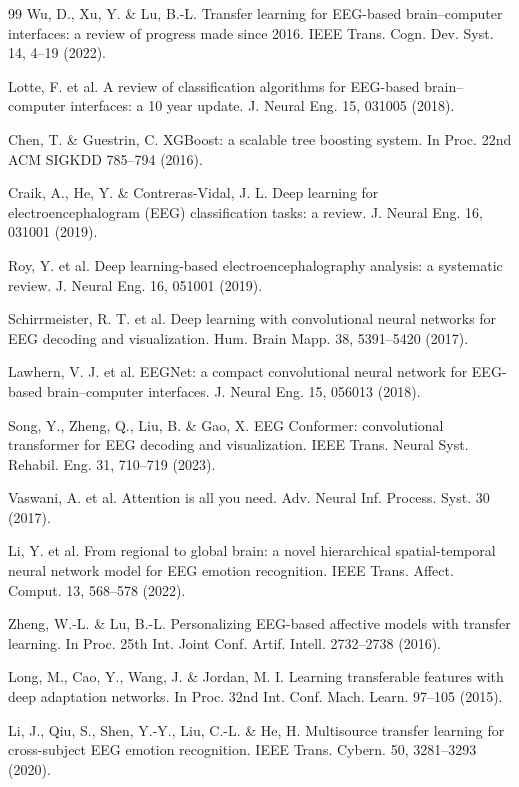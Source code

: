 \begin{thebibliography}{99}
 Wu, D., Xu, Y. \& Lu, B.-L. Transfer learning for EEG-based brain–computer interfaces: a review of progress made since 2016. IEEE Trans. Cogn. Dev. Syst. 14, 4–19 (2022).

 Lotte, F. et al. A review of classification algorithms for EEG-based brain–computer interfaces: a 10 year update. J. Neural Eng. 15, 031005 (2018).

 Chen, T. \& Guestrin, C. XGBoost: a scalable tree boosting system. In Proc. 22nd ACM SIGKDD 785–794 (2016).

 Craik, A., He, Y. \& Contreras-Vidal, J. L. Deep learning for electroencephalogram (EEG) classification tasks: a review. J. Neural Eng. 16, 031001 (2019).

 Roy, Y. et al. Deep learning-based electroencephalography analysis: a systematic review. J. Neural Eng. 16, 051001 (2019).

 Schirrmeister, R. T. et al. Deep learning with convolutional neural networks for EEG decoding and visualization. Hum. Brain Mapp. 38, 5391–5420 (2017).

 Lawhern, V. J. et al. EEGNet: a compact convolutional neural network for EEG-based brain–computer interfaces. J. Neural Eng. 15, 056013 (2018).

 Song, Y., Zheng, Q., Liu, B. \& Gao, X. EEG Conformer: convolutional transformer for EEG decoding and visualization. IEEE Trans. Neural Syst. Rehabil. Eng. 31, 710–719 (2023).

 Vaswani, A. et al. Attention is all you need. Adv. Neural Inf. Process. Syst. 30 (2017).

 Li, Y. et al. From regional to global brain: a novel hierarchical spatial-temporal neural network model for EEG emotion recognition. IEEE Trans. Affect. Comput. 13, 568–578 (2022).

 Zheng, W.-L. \& Lu, B.-L. Personalizing EEG-based affective models with transfer learning. In Proc. 25th Int. Joint Conf. Artif. Intell. 2732–2738 (2016).

 Long, M., Cao, Y., Wang, J. \& Jordan, M. I. Learning transferable features with deep adaptation networks. In Proc. 32nd Int. Conf. Mach. Learn. 97–105 (2015).

 Li, J., Qiu, S., Shen, Y.-Y., Liu, C.-L. \& He, H. Multisource transfer learning for cross-subject EEG emotion recognition. IEEE Trans. Cybern. 50, 3281–3293 (2020).


\end{thebibliography}
